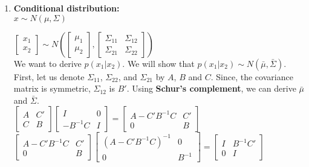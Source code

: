 \begin{enumerate}
	\item{ 
	\textbf{Conditional distribution:}\\
	$x \sim N(\mu , \Sigma)$ 
	
	$\begin{bmatrix}
	x_{1} \\
	x_{2}
	\end{bmatrix} \sim N ( 
	\begin{bmatrix}
	\mu_{1} \\
	\mu_{2}
	\end{bmatrix} , \begin{bmatrix}
	\Sigma_{11} & \Sigma_{12} \\
	\Sigma_{21} & \Sigma_{22}
	\end{bmatrix} )$\\
	
	We want to derive $p(x_{1} | x_{2})$. We will show that $p(x_{1} | x_{2}) \sim N ( \bar{\mu}, \bar{\Sigma})$.\\
	
	First, let us denote $\Sigma_{11}$, $\Sigma_{22}$, and $\Sigma_{21}$ by $A$, $B$ and $C$. Since, the covariance matrix is symmetric, $\Sigma_{12}$ is $B'$. Using \textbf{Schur's complement}, we can derive $\bar{\mu}$ and $\bar{\Sigma}$.\\
	
	$\begin{bmatrix}
	A & C' \\
	C & B
	\end{bmatrix} \begin{bmatrix}
	I & 0 \\
	-B^{-1}C & I
	\end{bmatrix} =
	\begin{bmatrix}
	A - C'B^{-1}C & C' \\
	0 & B
	\end{bmatrix}$\\
		
	$\begin{bmatrix}
	A - C'B^{-1}C & C' \\
	0 & B
	\end{bmatrix}
	\begin{bmatrix}
	(A - C'B^{-1}C)^{-1} & 0 \\
	0 & B^{-1}
	\end{bmatrix} =
	\begin{bmatrix}
	I & B^{-1}C' \\
	0 & I
	\end{bmatrix}$\\

}
\end{enumerate}
